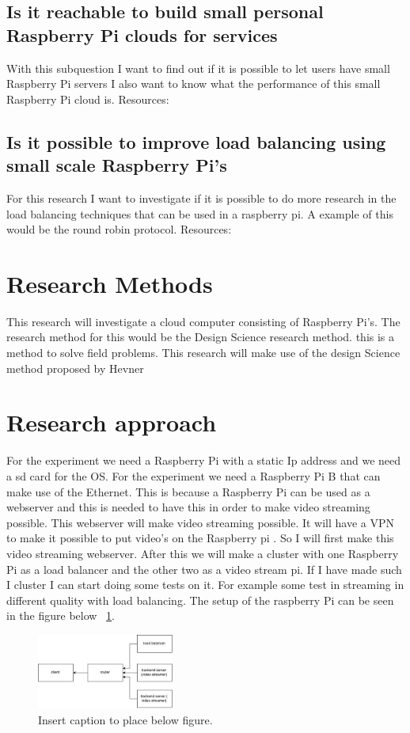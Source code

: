 \documentclass{sig-alternate-br}
\begin{document}
\subsection{Is it reachable to build small personal Raspberry Pi clouds for services}
With this subquestion I want to find out if it is possible to let users have small Raspberry Pi servers I also want to know what the performance of this small Raspberry Pi cloud is. 
Resources:
\cite{Pcextreme}

\subsection{Is it possible to improve load balancing using small scale Raspberry Pi's}
For this research I want to investigate if it is possible to do more research in the 
load balancing techniques that can be used in a raspberry pi. A example of this would be the round robin protocol.
Resources:

\section{Research Methods}
This research will investigate a cloud computer consisting of Raspberry Pi's. The research method for this would be the Design Science research method. this is a method to solve field problems. This research will make use of the design Science method proposed by Hevner\cite{hevner:2007}

\section{Research approach}
For the experiment we need a Raspberry Pi with a static Ip address and we need a sd card for the OS. For the experiment we need a Raspberry Pi B that can make use of the Ethernet. This is because a Raspberry Pi can be used as a webserver and this is needed to have this in order to make video streaming possible. This webserver will make video streaming possible. It will have a VPN to make it possible to put video's on the Raspberry pi \cite{VPN:2014}. 
So I will first make this video streaming webserver. 
After this we will make a cluster with one Raspberry Pi as a load balancer and the other two as a video stream pi. If I have made such I cluster I can start doing some tests on it. For example some test in streaming in different quality with load balancing. The setup of the raspberry Pi can be seen in the figure below ~\ref{fig:setup}.

\begin{figure}
\centering 
\includegraphics[width=0.4\textwidth]{raspberry pi setup.jpg}
\caption{Insert caption to place below figure.}
\label{fig:setup} %
\end{figure}
\end{document}
